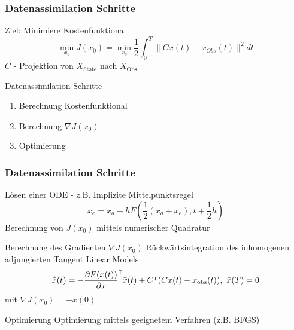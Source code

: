 \begin{frame}[<+->]
  \frametitle{Datenassimilation Schritte}
	\begin{block}{Ziel: Minimiere Kostenfunktional}
	\begin{equation}\label{eq:costFunctional}
		\min_{x_o} J(x_0) = \min_{x_o} \frac{1}{2}\int_0^T \|Cx(t) - x_{Obs}(t)\|^2dt
	\end{equation}
	  $C$ - Projektion von $X_{\text{State}}$ nach $X_{\text{Obs}}$ 
	\end{block}
	\begin{block}{Datenassimilation Schritte}
	\begin{enumerate}
	 \item Berechnung Kostenfunktional
	 \item Berechnung $\nabla J(x_0)$
	 \item Optimierung
	\end{enumerate}
	\end{block}
\end{frame}
 
\begin{frame}[<+->]
  \frametitle{Datenassimilation Schritte}
  \begin{block}{Lösen einer ODE - z.B. Implizite Mittelpunktsregel}
	\begin{equation}
	 x_e = x_a + h F \left(\frac{1}{2} (x_a + x_e), t + \frac{1}{2} h\right)
	\end{equation}
	Berechnung von $J(x_0)$ mittels numerischer Quadratur
  \end{block}
  \begin{block}{Berechnung des Gradienten $\nabla J(x_0)$}
	Rückwärtsintegration des inhomogenen adjungierten Tangent Linear Models
	\begin{equation}
	  \dot{ \bar{x}}(t) =  -\frac{\partial F(x(t))}{\partial x}^\intercal \bar x(t) +C^\intercal(Cx(t) - x_{\text{obs}}(t)), ~ \bar x(T) =0
	\end{equation}
	mit $\nabla J(x_0) = -\bar x(0)$
  \end{block}
  \begin{block}{Optimierung}
	Optimierung mittels geeignetem Verfahren (z.B. BFGS)
  \end{block}

\end{frame} 